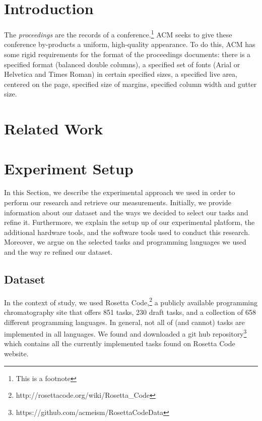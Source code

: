 \section{Introduction}

The \textit{proceedings} are the records of a conference.\footnote{This
  is a footnote}  ACM seeks
to give these conference by-products a uniform, high-quality
appearance.  To do this, ACM has some rigid requirements for the
format of the proceedings documents: there is a specified format
(balanced double columns), a specified set of fonts (Arial or
Helvetica and Times Roman) in certain specified sizes, a specified
live area, centered on the page, specified size of margins, specified
column width and gutter size.

\section{Related Work}

\section{Experiment Setup}
In this Section, we describe the experimental approach we 
used in order to perform our research and retrieve our 
measurements. 
Initially, we provide information about our dataset 
and the ways we decided to select our tasks and 
refine it.
Furthermore, we explain the setup up of our experimental 
platform, the additional hardware tools, and the software 
tools used to conduct this research. 
Moreover, we argue on the selected tasks and programming 
languages we used and the way re refined our dataset.

\subsection{Dataset}
In the context of study, we used Rosetta 
Code,\footnote{http://rosettacode.org/wiki/Rosetta\_Code} a 
publicly available programming chromatography site that offers 
851 tasks, 230 draft tasks, and a collection of 658 different 
programming languages. In general, not all of (and cannot) tasks 
are implemented in all languages. 
We found and downloaded a git hub repository\footnote{https://github.com/acmeism/RosettaCodeData} 
which contains all the currently implemented tasks found on 
Rosetta Code website.

